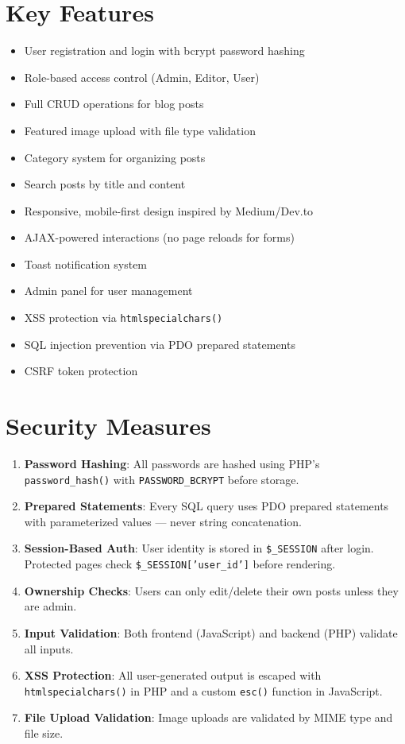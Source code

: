 \documentclass[12pt,a4paper]{report}
\begin{document}
\section{Key Features}
\begin{itemize}
    \item User registration and login with bcrypt password hashing
    \item Role-based access control (Admin, Editor, User)
    \item Full CRUD operations for blog posts
    \item Featured image upload with file type validation
    \item Category system for organizing posts
    \item Search posts by title and content
    \item Responsive, mobile-first design inspired by Medium/Dev.to
    \item AJAX-powered interactions (no page reloads for forms)
    \item Toast notification system
    \item Admin panel for user management
    \item XSS protection via \texttt{htmlspecialchars()}
    \item SQL injection prevention via PDO prepared statements
    \item CSRF token protection
\end{itemize}

\section{Security Measures}
\begin{enumerate}
    \item \textbf{Password Hashing}: All passwords are hashed using PHP's \texttt{password\_hash()} with \texttt{PASSWORD\_BCRYPT} before storage.
    \item \textbf{Prepared Statements}: Every SQL query uses PDO prepared statements with parameterized values --- never string concatenation.
    \item \textbf{Session-Based Auth}: User identity is stored in \texttt{\$\_SESSION} after login. Protected pages check \texttt{\$\_SESSION['user\_id']} before rendering.
    \item \textbf{Ownership Checks}: Users can only edit/delete their own posts unless they are admin.
    \item \textbf{Input Validation}: Both frontend (JavaScript) and backend (PHP) validate all inputs.
    \item \textbf{XSS Protection}: All user-generated output is escaped with \texttt{htmlspecialchars()} in PHP and a custom \texttt{esc()} function in JavaScript.
    \item \textbf{File Upload Validation}: Image uploads are validated by MIME type and file size.
\end{enumerate}
\end{document}

